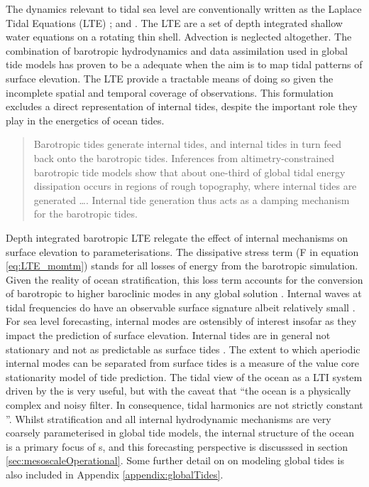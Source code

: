 The dynamics relevant to tidal sea level are conventionally written as the Laplace Tidal Equations (LTE) ; \citep[9.8]{gill1982atmosphere} and \citep{Hendershott:1981ub}.  The LTE are a set of depth integrated shallow water equations on a rotating thin shell.  Advection is neglected altogether.
The combination of barotropic hydrodynamics and data assimilation used in global tide models has proven to be a adequate when the aim is to map tidal patterns of surface elevation.  The LTE provide a tractable means of doing so given the incomplete spatial and temporal coverage of observations.
This formulation excludes a direct representation of internal tides, despite the important role they play in the energetics of ocean tides.
\begin{quote}
    Barotropic tides generate internal tides, and internal tides in turn feed back onto the barotropic tides. Inferences from altimetry-constrained barotropic tide models show that about one-third of global tidal energy dissipation occurs in regions of rough topography, where internal tides are generated \dots{}. Internal tide generation thus acts as a damping mechanism for the barotropic tides.\citep[pp22]{Arbic:hy}
\end{quote}
Depth integrated barotropic LTE relegate the effect of internal mechanisms on surface elevation to parameterisations.  The dissipative stress term (F in equation \ref{eq:LTE_momtm}) stands for all losses of energy from the barotropic simulation.  Given the reality of ocean stratification, this loss term accounts for the conversion of barotropic to higher baroclinic modes in any global solution \citep[pp121] {gill1982atmosphere}.
Internal waves at tidal frequencies do have an observable surface signature albeit relatively small \citep{Ray:2011tj}.  
For sea level forecasting, internal modes are ostensibly of interest insofar as they impact the prediction of surface elevation.  
Internal tides are in general not stationary and not as predictable as surface tides \citep{Nash:2012}.  The extent to which aperiodic internal modes can be separated from surface tides is a measure of the value core stationarity model of  tide prediction.
The tidal view of the ocean as a LTI system driven by the \ATGP{} is very useful, but with the caveat that ``the ocean is a physically complex and noisy filter.  In consequence, tidal harmonics are not strictly constant \citep[197]{Ray:2010jm}''.  
Whilst stratification and all internal hydrodynamic mechanisms are very coarsely parameterised in global tide models, the internal structure of the ocean is a primary focus of \OGCM{}s, and this forecasting perspective is discusssed in section \ref{sec:mesoscaleOperational}.  Some further detail on on modeling global tides is also included in Appendix \ref{appendix:globalTides}.

